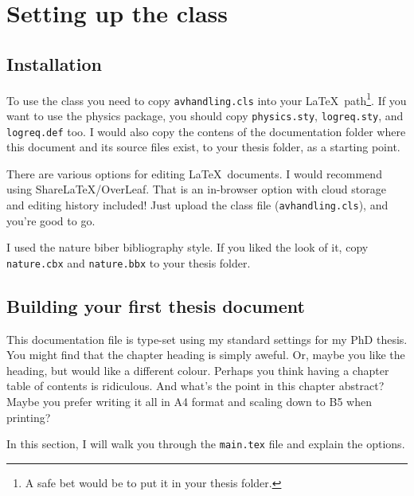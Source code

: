 \chapter{Setting up the class}
\label{ch:setup}


\section{Installation}
To use the \avhandling class you need to copy \texttt{avhandling.cls} into your \LaTeX\ path\footnote{A safe bet would be to put it in your thesis folder.}.
If you want to use the \textsf{physics} package, you should copy \texttt{physics.sty}, \texttt{logreq.sty}, and \texttt{logreq.def} too.
I would also copy the contens of the documentation folder where this document and its source files exist, to your thesis folder, as a starting point.

There are various options for editing \LaTeX\ documents.
I would recommend using ShareLaTeX/OverLeaf.
That is an in-browser option with cloud storage and editing history included!
Just upload the \avhandling class file (\texttt{avhandling.cls}), and you're good to go.

I used the \textsf{nature} \textsf{biber} bibliography style.
If you liked the look of it, copy \texttt{nature.cbx} and \texttt{nature.bbx} to your thesis folder.

\section{Building your first thesis document}
This documentation file is type-set using my standard settings for my PhD thesis.
You might find that the chapter heading is simply aweful.
Or, maybe you like the heading, but would like a different colour.
Perhaps you think having a chapter table of contents is ridiculous.
And what's the point in this chapter abstract?
Maybe you prefer writing it all in A4 format and scaling down to B5 when printing?

In this section, I will walk you through the \texttt{main.tex} file and explain the options.

